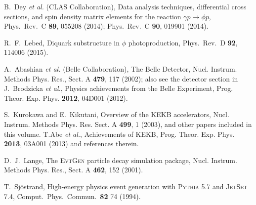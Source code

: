 \documentclass[aps,prl,twocolumn,superscriptaddress,showpacs,preprintnumbers,amsmath,amssymb]{revtex4-1}
\begin{document}
\begin{thebibliography}{99}
  B.~Dey {\it et al.} (CLAS Collaboration),
  Data analysis techniques, differential cross sections, and spin density matrix elements for the reaction $\gamma p \rightarrow \phi p$,
  Phys.\ Rev.\ C {\bf 89}, 055208 (2014);
Phys.\ Rev.\ C {\bf 90}, 019901 (2014).


  R.~F.~Lebed,
  Diquark substructure in $\phi$ photoproduction,
  Phys.\ Rev.\ D {\bf 92},  114006 (2015).

A.~Abashian {\it et al.} (Belle Collaboration), 
The Belle Detector,
Nucl. Instrum. Methods
 Phys. Res., Sect. A {\bf 479}, 117 (2002); also see the detector section in
 J.~Brodzicka {\it et al.}, 
Physics achievements from the Belle Experiment,
Prog. Theor. Exp. Phys. {\bf 2012}, 04D001 (2012). 



S.~Kurokawa and E.~Kikutani, 
Overview of the KEKB accelerators,
Nucl. Instrum. Methods Phys. Res. Sect.
 A {\bf 499}, 1 (2003), and other papers included in this volume.
T.Abe {\it et al.}, 
Achievements of KEKB,
Prog. Theor. Exp. Phys. {\bf 2013}, 03A001 (2013)
 and references therein.

  D.~J.~Lange,
  The {\mbox{\textsc{EvtGen}}\xspace} particle decay simulation package,
 Nucl. Instrum. Methods Phys. Res., Sect. A  {\bf 462}, 152 (2001).
  
  T.~Sj\"{o}strand,
 High-energy physics event generation with {\mbox{\textsc{Pythia}}\xspace} 5.7 and {\mbox{\textsc{JetSet}}\xspace} 7.4,
  Comput.\ Phys.\ Commun.\  {\bf 82}  74 (1994).


\end{thebibliography}
\end{document}
